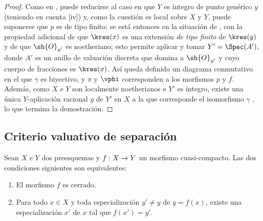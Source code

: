 \documentclass[oneside,10pt]{amsart}
\makeatletter
\newcommand{\ega@arrow}[2]{\mathchoice{#1}{#2}{#2}{#2}}
\renewcommand{\to}{\ega@arrow{\longrightarrow}{\rightarrow}}
\let\EGAOriginalLabel\label
\renewcommand{\label}[1]{\phantomsection\EGAOriginalLabel{#1}}
\makeatother
\begin{document}
\begin{proof}
Como en , puede reducirse al caso en que $Y$ es íntegro de punto genérico $y$ (teniendo en cuenta [iv]) y, como la cuestión es local sobre $X$ y $Y$, puede suponerse que $p$ es de tipo finito;
se está entonces en la situación de , con la propiedad adicional de que $\kres(x)$ es una extensión \emph{de tipo finito} de $\kres(y)$  y de que $\sh{O}_{y'}$ es noetheriano;
esto permite aplicar  y tomar $Y'=\Spec(A')$, donde $A'$ es un anillo de valuación discreta que domina a $\sh{O}_{y'}$ y cuyo cuerpo de fracciones es $\kres(x)$.
Así queda definido un diagrama conmutativo  en el que $\gamma$ es biyectivo, y $\pi$ y $\vphi$ corresponden a los morfismos $p$ y $f$.
Además, como $X$ e $Y$ son localmente noetherianos  e $Y'$ es íntegro, existe una única $Y$-aplicación racional $g$ de $Y'$ en $X$ a la que corresponde el isomorfismo $\gamma$ , lo que termina la demostración.
\end{proof}


\subsection{Criterio valuativo de separación}
\label{subsection:II.7.2}

\begin{proposition}[7.2.1]
\label{II.7.2.1}
Sean $X$ e $Y$ dos preesquemas y $f:X\to Y$ un morfismo cuasi-compacto.
Las dos condiciones siguientes son equivalentes:
\begin{enumerate}
  \item[\rm{(a)}] El morfismo $f$ es cerrado.
  \item[\rm{(b)}] Para todo $x\in X$ y toda especialización $y'\neq y$ de $y=f(x)$, existe una especialización $x'$ de $x$ tal que $f(x')=y'$.
\end{enumerate}
\end{proposition}
\end{document}
